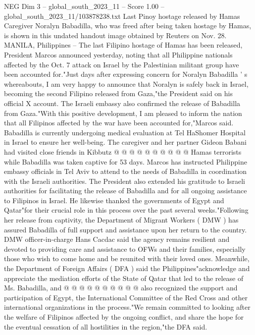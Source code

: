 \begin{textsample}{NEG Dim 3 – global\_south\_2023\_11 – Score 1.00 – global\_south\_2023\_11/103878238.txt}  \label{ex:f3_neg_086}
Last Pinoy hostage released by Hamas Caregiver Noralyn Babadilla, who was freed after being taken hostage by Hamas, is shown in this undated handout image obtained by Reuters on Nov. 28.
MANILA, Philippines -- The last Filipino hostage of Hamas has been released, President Marcos announced yesterday, noting that all Philippine nationals affected by the Oct. 7 attack on Israel by the Palestinian militant group have been accounted for."Just days after expressing concern for Noralyn Babadilla ' s whereabouts, I am very happy to announce that Noralyn is safely back in Israel, becoming the second Filipino released from Gaza,"the President said on his official X account.
The Israeli embassy also confirmed the release of Babadilla from Gaza."With this positive development, I am pleased to inform the nation that all Filipinos affected by the war have been accounted for,"Marcos said.
Babadilla is currently undergoing medical evaluation at Tel HaShomer Hospital in Israel to ensure her well-being.
The caregiver and her partner Gideon Babani had visited close friends in Kibbutz @ @ @ @ @ @ @ @ @ @ Hamas terrorists while Babadilla was taken captive for 53 days.
Marcos has instructed Philippine embassy officials in Tel Aviv to attend to the needs of Babadilla in coordination with the Israeli authorities.
The President also extended his gratitude to Israeli authorities for facilitating the release of Babadilla and for all ongoing assistance to Filipinos in Israel.
He likewise thanked the governments of Egypt and Qatar"for their crucial role in this process over the past several weeks."Following her release from captivity, the Department of Migrant Workers ( DMW ) has assured Babadilla of full support and assistance upon her return to the country.
DMW officer-in-charge Hans Cacdac said the agency remains resilient and devoted to providing care and assistance to OFWs and their families, especially those who wish to come home and be reunited with their loved ones.
Meanwhile, the Department of Foreign Affairs ( DFA ) said the Philippines"acknowledge and appreciate the mediation efforts of the State of Qatar that led to the release of Ms.
Babadilla, and @ @ @ @ @ @ @ @ @ @ also recognized the support and participation of Egypt, the International Committee of the Red Cross and other international organizations in the process."We remain committed to looking after the welfare of Filipinos affected by the ongoing conflict, and share the hope for the eventual cessation of all hostilities in the region,"the DFA said.

\end{textsample}
